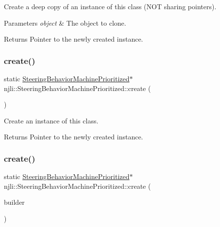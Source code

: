 Create a deep copy of an instance of this class (N\+OT sharing pointers).


\begin{DoxyParams}{Parameters}
{\em object} & The object to clone.\\
\hline
\end{DoxyParams}
\begin{DoxyReturn}{Returns}
Pointer to the newly created instance. 
\end{DoxyReturn}
\mbox{\label{classnjli_1_1_steering_behavior_machine_prioritized_a941f586892a65e7cd31603a12203a307}} 
\subsubsection{\texorpdfstring{create()}{create()}\hspace{0.1cm}{\footnotesize\ttfamily [1/2]}}
{\footnotesize\ttfamily static \mbox{\hyperlink{classnjli_1_1_steering_behavior_machine_prioritized}{Steering\+Behavior\+Machine\+Prioritized}}$\ast$ njli\+::\+Steering\+Behavior\+Machine\+Prioritized\+::create (\begin{DoxyParamCaption}{ }\end{DoxyParamCaption})\hspace{0.3cm}{\ttfamily [static]}}

Create an instance of this class.

\begin{DoxyReturn}{Returns}
Pointer to the newly created instance. 
\end{DoxyReturn}
\mbox{\label{classnjli_1_1_steering_behavior_machine_prioritized_a0e75da87a00d1c8feb82a444eedb599d}} 
\subsubsection{\texorpdfstring{create()}{create()}\hspace{0.1cm}{\footnotesize\ttfamily [2/2]}}
{\footnotesize\ttfamily static \mbox{\hyperlink{classnjli_1_1_steering_behavior_machine_prioritized}{Steering\+Behavior\+Machine\+Prioritized}}$\ast$ njli\+::\+Steering\+Behavior\+Machine\+Prioritized\+::create (\begin{DoxyParamCaption}\item[{const \mbox{\hyperlink{classnjli_1_1_steering_behavior_machine_prioritized_builder}{Steering\+Behavior\+Machine\+Prioritized\+Builder}} \&}]{builder }\end{DoxyParamCaption})\hspace{0.3cm}{\ttfamily [static]}}

